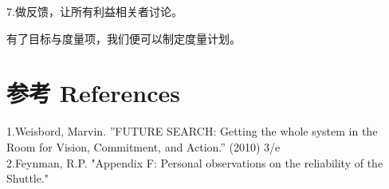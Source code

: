 7.做反馈，让所有利益相关者讨论。

有了目标与度量项，我们便可以制定度量计划。




\hypertarget{ux9644ux4ef6}{%
\section{参考 References}\label{ux9644ux4ef6}}

1.Weisbord, Marvin. ''FUTURE SEARCH: Getting the whole system in the Room for Vision, Commitment, and Action.'' (2010) 3/e  \\

2.Feynman, R.P. "Appendix F: Personal observations on the reliability of the Shuttle."



